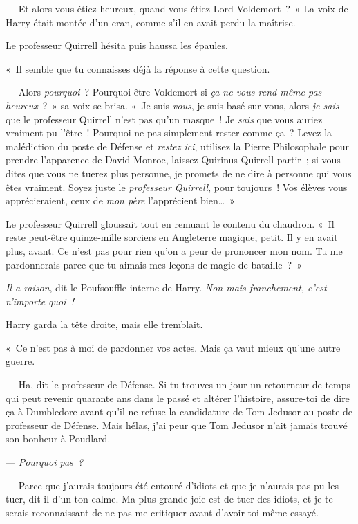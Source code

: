 --- Et alors vous étiez heureux, quand vous étiez Lord Voldemort~?~» La voix de Harry était montée d'un cran, comme s'il en avait perdu la maîtrise.

Le professeur Quirrell hésita puis haussa les épaules.

«~Il semble que tu connaisses déjà la réponse à cette question.

--- Alors \emph{pourquoi}~? Pourquoi être Voldemort si \emph{ça ne vous rend même pas heureux}~?~» sa voix se brisa. «~Je suis \emph{vous}, je suis basé sur vous, alors \emph{je sais} que le professeur Quirrell n'est pas qu'un masque~! Je \emph{sais} que vous auriez vraiment pu l'être~! Pourquoi ne pas simplement rester comme ça~? Levez la malédiction du poste de Défense et \emph{restez ici}, utilisez la Pierre Philosophale pour prendre l'apparence de David Monroe, laissez Quirinus Quirrell partir~; si vous dites que vous ne tuerez plus personne, je promets de ne dire à personne qui vous êtes vraiment. Soyez juste le \emph{professeur Quirrell}, pour toujours~! Vos élèves vous apprécieraient, ceux de \emph{mon père} l'apprécient bien…~»

Le professeur Quirrell gloussait tout en remuant le contenu du chaudron. «~Il reste peut-être quinze-mille sorciers en Angleterre magique, petit. Il y en avait plus, avant. Ce n'est pas pour rien qu'on a peur de prononcer mon nom. Tu me pardonnerais parce que tu aimais mes leçons de magie de bataille~?~»

\emph{Il a raison}, dit le Poufsouffle interne de Harry. \emph{Non mais franchement, c'est n'importe quoi~!}

Harry garda la tête droite, mais elle tremblait.

«~Ce n'est pas à moi de pardonner vos actes. Mais ça vaut mieux qu'une autre guerre.

--- Ha, dit le professeur de Défense. Si tu trouves un jour un retourneur de temps qui peut revenir quarante ans dans le passé et altérer l'histoire, assure-toi de dire ça à Dumbledore avant qu'il ne refuse la candidature de Tom Jedusor au poste de professeur de Défense. Mais hélas, j'ai peur que Tom Jedusor n'ait jamais trouvé son bonheur à Poudlard.

--- \emph{Pourquoi pas~?}

--- Parce que j'aurais toujours été entouré d'idiots et que je n'aurais pas pu les tuer, dit-il d'un ton calme. Ma plus grande joie est de tuer des idiots, et je te serais reconnaissant de ne pas me critiquer avant d'avoir toi-même essayé.

